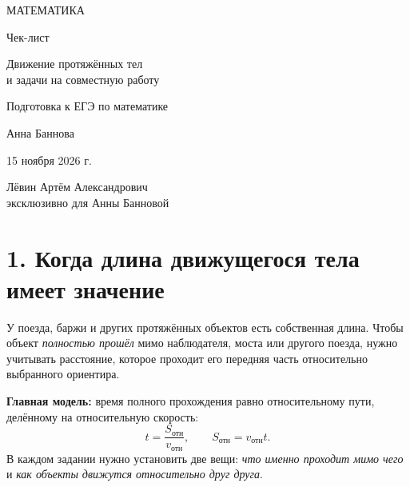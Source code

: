 \documentclass[a4paper,12pt]{article}
\newcommand{\key}[1]{\textcolor{darkaccent}{\textbf{#1}}}
\begin{document}
\thispagestyle{empty}
\begin{center}
\vspace*{24mm}
{\Large\color{darkaccent} МАТЕМАТИКА}\par
\vspace{20mm}
{\fontsize{29}{34}\selectfont\color{ink} Чек-лист}\par
\vspace{11mm}
{\fontsize{20}{27}\selectfont\color{accent} Движение протяжённых тел\\[2mm] и задачи на совместную работу}\par
\vspace{18mm}
{\large Подготовка к ЕГЭ по математике}\par
\vfill
{\Large Анна Баннова}\par
\vspace{11mm}
{\large 15 ноября 2026 г.}\par
\vspace{17mm}
{\normalsize Лёвин Артём Александрович\\эксклюзивно для Анны Банновой}\par
\vspace{14mm}
\end{center}
\clearpage

\section*{1. Когда длина движущегося тела имеет значение}
У поезда, баржи и других протяжённых объектов есть собственная длина. Чтобы объект \emph{полностью прошёл} мимо наблюдателя, моста или другого поезда, нужно учитывать расстояние, которое проходит его передняя часть относительно выбранного ориентира.

\key{Главная модель:} время полного прохождения равно относительному пути, делённому на относительную скорость:
\[
\boxed{\displaystyle t=\frac{S_{\text{отн}}}{v_{\text{отн}}}},\qquad
S_{\text{отн}}=v_{\text{отн}}t.
\]
В каждом задании нужно установить две вещи: \emph{что именно проходит мимо чего} и \emph{как объекты движутся относительно друг друга}.
\end{document}
